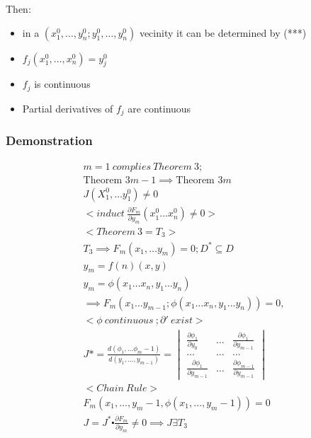 \documentclass[11pt,fleqn]{book} %
\begin{document}
Then:

\begin{itemize}
    \item in a  $(x_1^0, \dots , y_n^0;y_1^0, \dots , y_n^0)$ vecinity it can be determined by (***)
    \item $f_j (x_1^0, \dots, x_n^0) = y_j^0$
    \item $f_j$ is continuous
    \item Partial derivatives of $f_j$ are continuous
\end{itemize}

\subsubsection*{Demonstration}
\begin{gather}
    m = 1 \ complies \ Theorem \ 3; \\
    \text{Theorem 3} m - 1 \implies \text{Theorem 3} m \\
    J(X_1^0, \dots y_1^0) \neq 0\\
    <induct \ \frac{\partial F_m}{\partial y_m}(x_1^0 \dots x_n^0) \neq 0 > \\
    <Theorem \ 3 = T_3>\\
    T_3 \implies F_m(x_1, \dots y_m) = 0; D^* \subseteq D\\
    y_m = f(n)(x,y)\\
    y_m = \phi (x_1 \dots x_n, y_1 \dots y_n)\\
    \implies F_m(x_1 \dots y_{m-1};\phi (x_1 \dots x_n, y_1 \dots y_n)) = 0, \\
    <\phi \ continuous \ ; \partial ' \ exist>\\
    J* = \frac{d(\phi_1, \dots \phi_m-1)}{d(y_1, \dots, y_{m-1})} = \begin{vmatrix}
        \frac{\partial \phi_1}{\partial y_0} & \dots & \frac{\partial \phi_1}{\partial y_{m-1}}\\
        \dots & \dots & \dots \\
        \frac{\partial \phi_1}{\partial y_{m-1}} & \dots & \frac{\partial \phi_{m-1}}{\partial y_{m-1}}
    \end{vmatrix}\\
    <Chain \ Rule>\\
    F_m(x_1, \dots, y_m-1, \phi (x_1, \dots, y_m-1)) = 0\\
    J = J^* \centerdot \frac{\partial F_m}{\partial y_m} \neq 0 \implies J \exists T_3
\end{gather}
\end{document}

